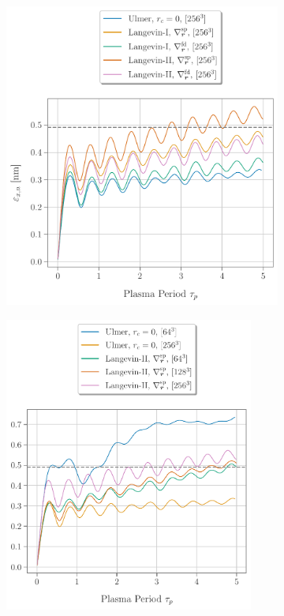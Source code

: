 \begin{figure}[h]
  \begin{subfigure}[b]{0.535\textwidth}
    \includegraphics[width=\textwidth]{figures/results/Efield_gradient_test.pdf}
    \caption{}
    \label{fig:EfieldGradientTest}
  \end{subfigure}
  \hfill
  \begin{subfigure}[b]{0.548\textwidth}
    \includegraphics[width=0.9\textwidth]{figures/results/meshsize_test.pdf}

\end{subfigure}
\end{figure}
